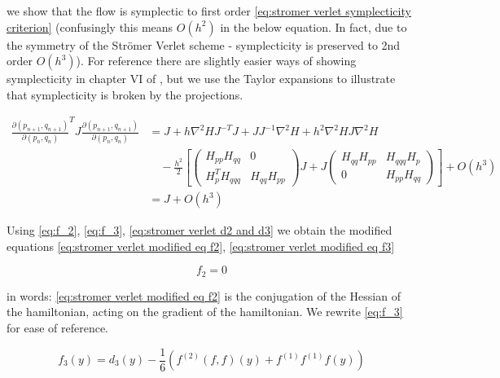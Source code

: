 \documentclass[12pt]{article}
\begin{document}
we show that the flow is symplectic to first order \eqref{eq:stromer verlet symplecticity criterion} (confusingly this means $O(h^2)$ in the below equation. In fact, due to the symmetry of the Str\"omer Verlet scheme - symplecticity is preserved to 2nd order $O(h^3)$). For reference there are slightly easier ways of showing symplecticity in chapter VI of \cite{Numerical}, but we use the Taylor expansions to illustrate that symplecticity is broken by the projections. 

\begin{equation}\label{eq:stromer verlet symplecticity criterion}
\begin{split}
\frac{\partial(p_{n+1},q_{n+1})}{\partial(p_n,q_n)}^T J\frac{\partial(p_{n+1},q_{n+1})}{\partial(p_n,q_n)} & = J + h\nabla^2H J^{-T}J + JJ^{-1}\nabla^2H + h^2\nabla^2HJ\nabla^2H\\ &\quad - \frac{h^2}{2}
\left[
\begin{pmatrix} H_{pp}H_{qq} & 0\\ H_p^TH_{qqq} & H_{qq}H_{pp} \end{pmatrix}J + J\begin{pmatrix} H_{qq}H_{pp} & H_{qqq}H_p \\ 0 & H_{pp}H_{qq} \end{pmatrix}
\right] + O(h^3)\\ & = J + O(h^3)
\end{split}
\end{equation}

Using \eqref{eq:f_2}, \eqref{eq:f_3}, \eqref{eq:stromer verlet d2 and d3} we obtain the modified equations \eqref{eq:stromer verlet modified eq f2}, \eqref{eq:stromer verlet modified eq f3}

\begin{equation}\label{eq:stromer verlet modified eq f2}
    f_2 = 0
\end{equation}

in words: \eqref{eq:stromer verlet modified eq f2} is the conjugation of the Hessian of the hamiltonian, acting on the gradient of the hamiltonian. We rewrite \eqref{eq:f_3} for ease of reference.

$$f_3(y) = d_3(y) - \frac{1}{6}\left( f^{(2)} (f , f)(y) + f^{(1)} f^{(1)} f(y) \right)$$
\end{document}
